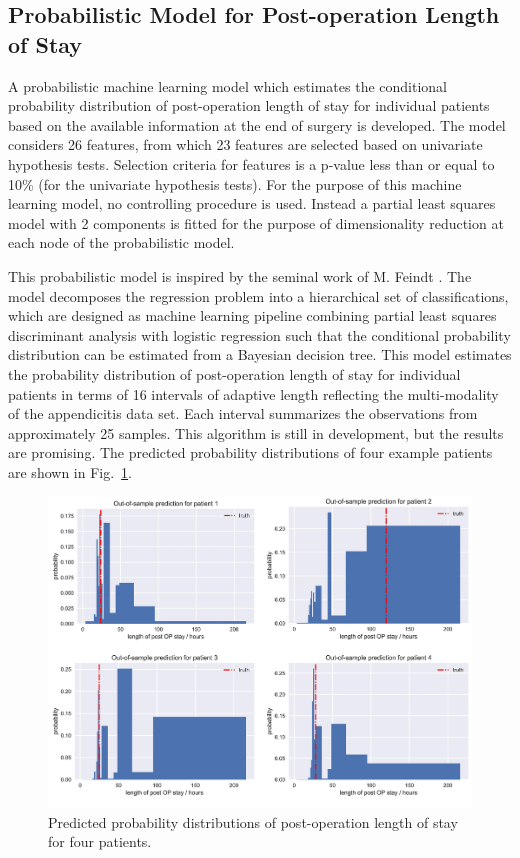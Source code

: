 \documentclass{elsarticle}
\begin{document}
\subsection{Probabilistic Model for Post-operation Length of Stay}
A probabilistic machine learning model which estimates the conditional probability distribution of post-operation length of stay for individual patients based on the available information at the end of surgery is developed. The model considers 26 features, from which 23 features are selected based on univariate hypothesis tests. Selection criteria for features is a p-value less than or equal to 10\% (for the univariate hypothesis tests). For the purpose of this machine learning model, no controlling procedure is used. Instead a partial least squares model with 2 components is fitted for the purpose of dimensionality reduction at each node of the probabilistic model.

This probabilistic model is inspired by the seminal work of M. Feindt \cite{Feindt2004}. The model decomposes the regression problem into a hierarchical set of classifications, which are designed as machine learning pipeline combining partial least squares discriminant analysis with logistic regression such that the conditional probability distribution can be estimated from a Bayesian decision tree. This model estimates the probability distribution of post-operation length of stay for individual patients in terms of 16 intervals of adaptive length reflecting the multi-modality of the appendicitis data set. Each interval summarizes the observations from approximately 25 samples. This algorithm is still in development, but the results are promising. The predicted probability distributions of four example patients are shown in Fig.~\ref{fig:probabilistic distribution}.

\begin{figure}[t]
\centering
\includegraphics[width=\textwidth]{images/akl_pls_probabilistic_distribution.png}
\caption{Predicted probability distributions of post-operation length of stay for four patients.}
\label{fig:probabilistic distribution}
\end{figure}
\end{document}
